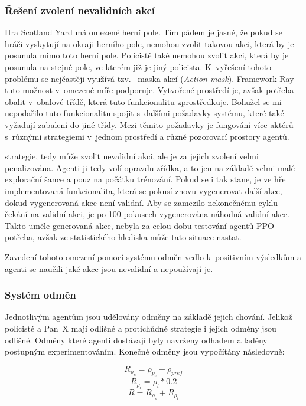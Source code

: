\subsubsection*{Řešení zvolení nevalidních akcí}

Hra Scotland Yard má omezené herní pole.
Tím pádem je jasné, že pokud se hráči vyskytují na okraji herního pole, nemohou zvolit takovou akci, která by je posunula mimo toto herní pole.
Policisté také nemohou zvolit akci, která by je posunula na stejné pole, ve kterém již je jiný policista.
K~vyřešení tohoto problému se nejčastěji využívá tzv.~ maska akcí (\emph{Action mask}).
Framework Ray tuto možnost v~omezené míře podporuje.
Vytvořené prostředí je, avšak potřeba obalit v~obalové třídě, která tuto funkcionalitu zprostředkuje.
Bohužel se mi nepodařilo tuto funkcionalitu spojit s~dalšími požadavky systému, které také vyžadují zabalení do jiné třídy.
Mezi těmito požadavky je fungování více aktérů s~různými strategiemi v~jednom prostředí a různé pozorovací prostory agentů.

strategie, tedy může zvolit nevalidní akci, ale je za jejich zvolení velmi penalizována.
Agenti ji tedy volí opravdu zřídka, a to jen na základě velmi malé explorační šance a pouz na počátku trénování.
Pokud se i tak stane, je ve hře implementovaná funkcionalita, která se pokusí znovu vygenerovat další akce, dokud vygenerovaná akce není validní.
Aby se zamezilo nekonečnému cyklu čekání na validní akci, je po 100 pokusech vygenerována náhodná validní akce.
Takto uměle generovaná akce, nebyla za celou dobu testování agentů PPO potřeba, avšak ze statistického hlediska může tato situace nastat.

Zavedení tohoto omezení pomocí systému odměn vedlo k~positivním výsledkům a agenti se naučili jaké akce jsou nevalidní a nepoužívají je.

\subsubsection*{Systém odměn}
\label{subsubsec:odmeny}

Jednotlivým agentům jsou udělovány odměny na základě jejich chování.
Jelikož policisté a Pan~X mají odlišné a protichůdné strategie i jejich odměny jsou odlišné.
Odměny které agenti dostávají byly navrženy odhadem a laděny postupným experimentováním.
Konečné odměny jsou vypočítány následovně:

\begin{equation}
    \label{eq:odmena_za_vzdalenost_od_policisty}
  R_{\rho_p} = \rho_{p_c} - \rho_{pref}
\end{equation}
\begin{equation}
    \label{eq:odmena_za_vzdalenost_od_posledni_pozice}
  R_{\rho_l} = \rho_l * 0.2
\end{equation}
\begin{equation}
    \label{eq:celkova_odmena}
  R = R_{\rho_p} + R_{\rho_l}
\end{equation}

